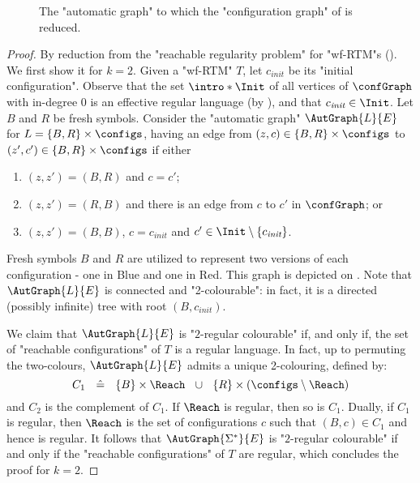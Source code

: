 \begin{figure}
	\centering
	\begin{tikzpicture}
		
	\end{tikzpicture}
	\caption{
		\AP\label{fig:reduction-wf-RTM}
		The "automatic graph" to which the "configuration graph" of
		 is reduced.
	}
\end{figure}
%
\begin{proof}
    By reduction from the "reachable regularity problem" for "wf-RTM"s
    (). We first show it for $k=2$.
    \AP Given a "wf-RTM" $T$, let $c_{\textit{init}}$ be its "initial configuration".
    Observe that the set $\intro*\Init$ of all vertices of $\confGraph$ with in-degree $0$ is an effective regular language (by ), and that $c_{\textit{init}} \in \Init$. Let $B$ and $R$ be fresh symbols. 
    Consider the "automatic graph" $\AutGraph{L}{E}$ for $L = \set{B,R} \times \configs$, having 
    an edge from $(z,c) \in \{B,R\} \times \configs$ to $(z',c') \in \{B,R\} \times \configs$ if either 
    \begin{enumerate}
        \item $(z,z') = (B,R)$ and $c=c'$;
        \item $(z,z') = (R,B)$ and there is an edge from $c$ to $c'$ in $\confGraph$; or
        \item $(z,z') = (B,B)$, $c = c_{\textit{init}}$ and $c' \in \Init \setminus \set{c_{\textit{init}}}$.
    \end{enumerate}
Fresh symbols $B$ and $R$ are utilized to represent two versions of each configuration - one in Blue and one in Red. This graph is depicted
    on .
    Note that $\AutGraph{L}{E}$ is connected and "2-colourable": in fact, it is a directed (possibly infinite) tree with root $(B,c_{\textit{init}})$. 
    
    We claim that $\AutGraph{L}{E}$ is "$2$-regular colourable" if, and only if, the set of "reachable configurations" of $T$ is a regular language. 
    In fact, up to permuting the two-colours, 
  $\AutGraph{L}{E}$ admits a unique 2-colouring, defined by:
    \[
        C_1 ~~ \defeq ~~ \{B\} \times \Reach ~~\cup~~ \{R\} \times (\configs \setminus \Reach)
    \]
    and $C_2$ is the complement of $C_1$.
    If $\Reach$ is regular, then so is $C_1$. Dually, if $C_1$ is regular, then
    $\Reach$ is the set of configurations $c$ such that $(B,c) \in C_1$ and hence is regular.
    It follows that $\AutGraph{\Sigma^*}{E}$ is "$2$-regular colourable" if and only if
    the "reachable configurations" of $T$ are regular, which concludes the proof for $k=2$.


\end{proof}
